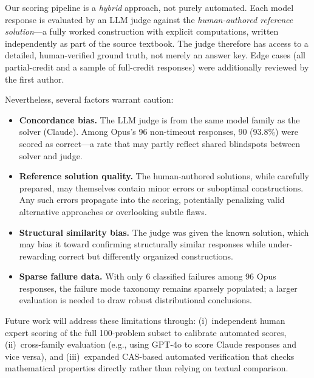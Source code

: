 Our scoring pipeline is a \emph{hybrid} approach, not purely automated.
Each model response is evaluated by an LLM judge against the \emph{human-authored reference solution}---a fully worked construction with explicit computations, written independently as part of the source textbook.
The judge therefore has access to a detailed, human-verified ground truth, not merely an answer key.
Edge cases (all partial-credit and a sample of full-credit responses) were additionally reviewed by the first author.

Nevertheless, several factors warrant caution:
\begin{itemize}[nosep]
  \item \textbf{Concordance bias.} The LLM judge is from the same model family as the solver (Claude).
  Among Opus's 96 non-timeout responses, 90 (93.8\%) were scored as correct---a rate that may partly reflect shared blindspots between solver and judge.
  \item \textbf{Reference solution quality.} The human-authored solutions, while carefully prepared, may themselves contain minor errors or suboptimal constructions. Any such errors propagate into the scoring, potentially penalizing valid alternative approaches or overlooking subtle flaws.
  \item \textbf{Structural similarity bias.} The judge was given the known solution, which may bias it toward confirming structurally similar responses while under-rewarding correct but differently organized constructions.
  \item \textbf{Sparse failure data.} With only 6 classified failures among 96 Opus responses, the failure mode taxonomy remains sparsely populated; a larger evaluation is needed to draw robust distributional conclusions.
\end{itemize}

Future work will address these limitations through: (i)~independent human expert scoring of the full 100-problem subset to calibrate automated scores, (ii)~cross-family evaluation (e.g., using GPT-4o to score Claude responses and vice versa), and (iii)~expanded CAS-based automated verification that checks mathematical properties directly rather than relying on textual comparison.
